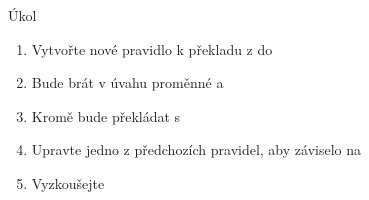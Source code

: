 \begin{frame}{Úkol}

  \begin{enumerate}
    \item Vytvořte nové pravidlo k překladu z  do 
    \item Bude brát v úvahu proměnné  a 
    \item Kromě  bude překládat s 
    \item Upravte jedno z předchozích  pravidel, aby záviselo na
    \item Vyzkoušejte
  \end{enumerate}

\end{frame}

